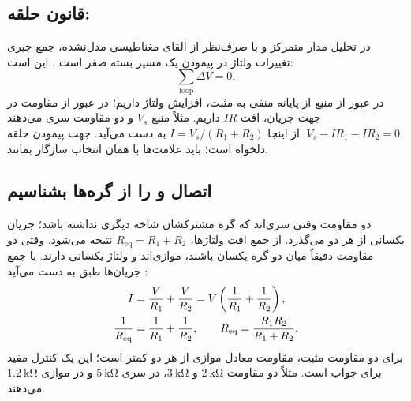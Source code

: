 \subsection{قانون حلقه: }
در تحلیل مدار متمرکز و با صرف‌نظر از القای مغناطیسی مدل‌نشده، جمع جبری تغییرات
ولتاژ در پیمودن یک مسیر بسته صفر است \cite{kirchhoff}.
این  است:
\begin{equation}\label{eq:foundation-kvl}
\sum_{\mathrm{loop}}\Delta V=0.
\end{equation}
در عبور از منبع از پایانه منفی به مثبت، افزایش ولتاژ داریم؛ در عبور از مقاومت
در جهت جریان، افت \(IR\) داریم. مثلاً منبع \(V_s\) و دو مقاومت سری می‌دهند
\(V_s-IR_1-IR_2=0\). از اینجا
\(I=V_s/(R_1+R_2)\) به دست می‌آید. جهت پیمودن حلقه دلخواه است؛
باید علامت‌ها با همان انتخاب سازگار بمانند.

\subsection{اتصال  و  را از گره‌ها بشناسیم}
دو مقاومت وقتی سری‌اند که گره مشترکشان شاخه دیگری نداشته باشد؛ جریان یکسانی از
هر دو می‌گذرد. از جمع افت ولتاژها، \(R_{\mathrm{eq}}=R_1+R_2\) نتیجه می‌شود.
وقتی دو مقاومت دقیقاً میان دو گره یکسان باشند، موازی‌اند و ولتاژ یکسانی دارند.
با جمع جریان‌ها طبق  به دست می‌آید \cite{resistors}:
\begin{align}
I&=\frac{V}{R_1}+\frac{V}{R_2}
=V\left(\frac{1}{R_1}+\frac{1}{R_2}\right),\notag\\
\frac{1}{R_{\mathrm{eq}}}&=\frac{1}{R_1}+\frac{1}{R_2},
\qquad R_{\mathrm{eq}}=\frac{R_1R_2}{R_1+R_2}.
\label{eq:foundation-parallel}
\end{align}
برای دو مقاومت مثبت، مقاومت معادل موازی از هر دو کمتر است؛ این یک کنترل مفید برای جواب است.
مثلاً دو مقاومت \(\qty{2}{\kilo\ohm}\) و \(\qty{3}{\kilo\ohm}\)،
در سری \(\qty{5}{\kilo\ohm}\) و در موازی \(\qty{1.2}{\kilo\ohm}\) می‌دهند.

